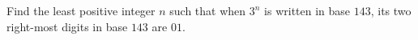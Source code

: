 Find the least positive integer $n$ such that when $3^n$ is written in base $143$,  its two right-most digits in base $143$ are $01$.